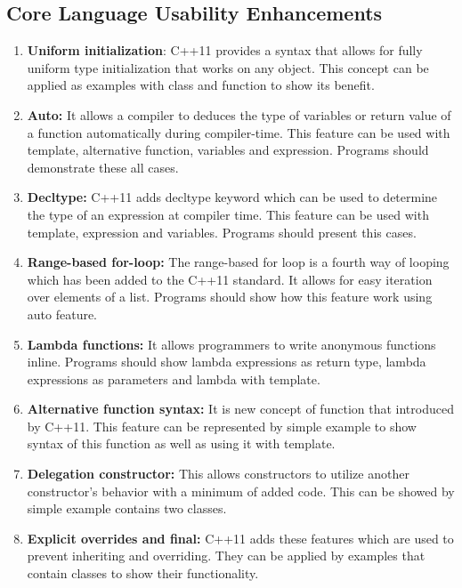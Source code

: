\documentclass[11pt]{report}
\begin{document}
\subsection{Core Language Usability Enhancements}
\begin{enumerate}
\item \textbf{Uniform initialization}: C++11 provides a syntax that allows for fully uniform type initialization that works on any object. This concept can be applied as examples with class and function to show its benefit.

\item \textbf{Auto:} It allows a compiler to deduces the type of variables or return value of a function automatically during compiler-time. This feature can be used with template, alternative function, variables and expression. Programs should demonstrate these all cases.

\item \textbf{Decltype:} C++11 adds decltype keyword which can be used to \linebreak determine the type of an expression at compiler time. This feature can be used with template, expression and variables. Programs should present this cases.

\item \textbf{Range-based for-loop:} The range-based for loop is a fourth way of looping which has been added to the C++11 standard. It allows for easy iteration over elements of a list. Programs should show how this feature work using auto feature.

\item \textbf{Lambda functions:} It allows programmers to write anonymous \linebreak functions inline. Programs should show lambda expressions as return type, lambda expressions as parameters and lambda with template.

\item \textbf{Alternative function syntax:} It is new concept of function that \linebreak introduced by C++11. This feature can be represented by simple example to show syntax of this function as well as using it with template.

\item \textbf{Delegation constructor: } This allows constructors to utilize another constructor's behavior with a minimum of added code. This can be showed by  simple example contains two classes.

\item \textbf{Explicit overrides and final:} C++11 adds these features which are used to prevent inheriting and overriding. They can be applied by \linebreak examples that contain classes to show their functionality.


\end{enumerate}
\end{document}
